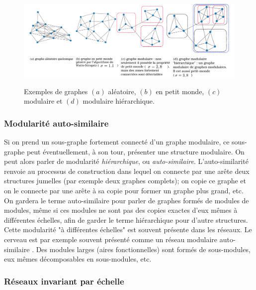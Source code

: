\begin{figure}
\centering
\includegraphics[width=\textwidth]{types_graphes.pdf}
\label{fig:graphe}
\caption{Exemples de graphes $(a)$ aléatoire, $(b)$ en petit monde, $(c)$ modulaire et $(d)$ modulaire hiérarchique.}
\end{figure}


\subsubsection{Modularité auto-similaire}

Si on prend un sous-graphe fortement connecté d'un graphe modulaire, ce sous-graphe peut éventuellement, à son tour, présenter une structure modulaire. On peut alors parler de modularité \emph{hiérarchique}, ou \emph{auto-similaire}. L'auto-similarité renvoie au processus de construction dans lequel on connecte par une arête deux structures jumelles (par exemple deux graphes complets); on copie ce graphe et on le connecte par une arête à sa copie pour former un graphe plus grand, etc. On gardera le terme auto-similaire pour parler de graphes formés de modules de modules, même si ces modules ne sont pas des copies exactes d'eux mêmes à différentes échelles, afin de garder le terme hiérarchique pour d'autre structures. Cette modularité "à différentes échelles" est souvent présente dans les réseaux. Le cerveau est par exemple souvent présenté comme un réseau modulaire auto-similaire \cite{Meunier2010ModularAH}. Des modules larges (aires fonctionnelles) sont formés de sous-modules, eux mêmes décomposables en sous-modules, etc. 

\subsubsection{Réseaux invariant par échelle}

